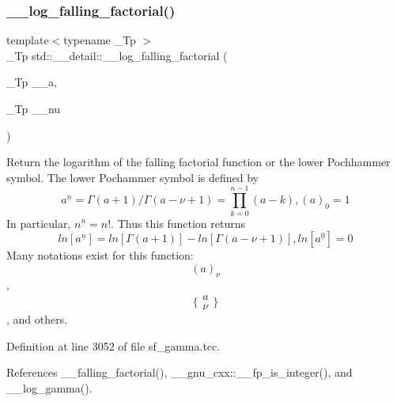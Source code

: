 \mbox{\label{namespacestd_1_1____detail_abc3aa91fde134d9f01be8fc8e7c7cc79}} 
\subsubsection{\texorpdfstring{\+\_\+\+\_\+log\+\_\+falling\+\_\+factorial()}{\_\_log\_falling\_factorial()}}
{\footnotesize\ttfamily template$<$typename \+\_\+\+Tp $>$ \\
\+\_\+\+Tp std\+::\+\_\+\+\_\+detail\+::\+\_\+\+\_\+log\+\_\+falling\+\_\+factorial (\begin{DoxyParamCaption}\item[{\+\_\+\+Tp}]{\+\_\+\+\_\+a,  }\item[{\+\_\+\+Tp}]{\+\_\+\+\_\+nu }\end{DoxyParamCaption})}



Return the logarithm of the falling factorial function or the lower Pochhammer symbol. The lower Pochammer symbol is defined by \[ a^{\underline{n}} = \Gamma(a + 1) / \Gamma(a - \nu + 1) = \prod_{k=0}^{n-1} (a - k), (a)_0 = 1 \] In particular, $ n^{\underline{n}} = n! $. Thus this function returns \[ ln[a^{\underline{n}}] = ln[\Gamma(a + 1)] - ln[\Gamma(a - \nu + 1)], ln[a^{\underline{0}}] = 0 \] Many notations exist for this function\+: \[ (a)_\nu \], \[ \{ \begin{array}{c} a \\ \nu \end{array} \} \], and others. 



Definition at line 3052 of file sf\+\_\+gamma.\+tcc.



References \+\_\+\+\_\+falling\+\_\+factorial(), \+\_\+\+\_\+gnu\+\_\+cxx\+::\+\_\+\+\_\+fp\+\_\+is\+\_\+integer(), and \+\_\+\+\_\+log\+\_\+gamma().

\mbox{\label{namespacestd_1_1____detail_af6c4c0192a07f467fd9ddeebb28a34d4}} 

